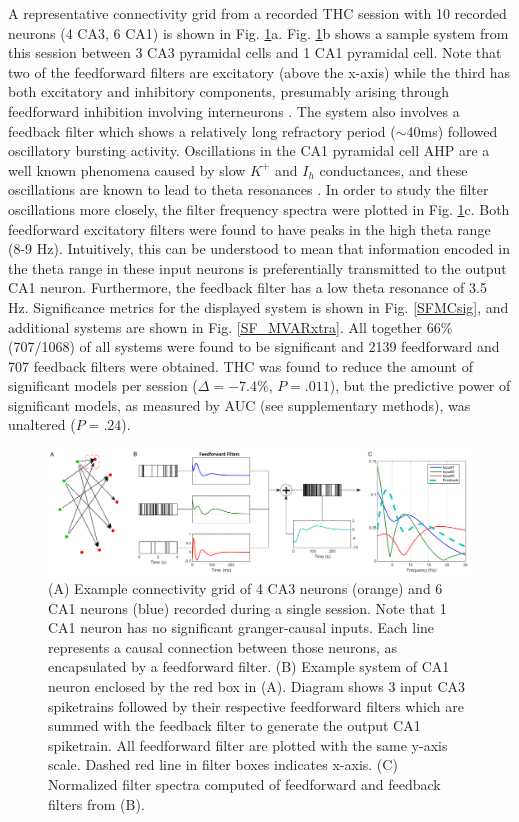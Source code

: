 \documentclass[11pt,a4paper,final]{article}
\begin{document}
A representative connectivity grid from a recorded THC session with 10 recorded neurons (4 CA3, 6 CA1) is shown in Fig. \ref{ex}a.
Fig. \ref{ex}b shows a sample system from this session between 3 CA3 pyramidal cells and 1 CA1 pyramidal cell.
Note that two of the feedforward filters are excitatory (above the x-axis) while the third has both excitatory and inhibitory components, presumably arising through feedforward inhibition involving interneurons \citep{pouille01,zemankovics13}.
The system also involves a feedback filter which shows a relatively long refractory period ($\sim$40ms) followed oscillatory bursting activity.
Oscillations in the CA1 pyramidal cell AHP are a well known phenomena caused by slow $K^+$ and $I_h$ conductances, and these oscillations are known to lead to theta resonances \citep{leung98,yarom00,sandler14}.
In order to study the filter oscillations more closely, the filter frequency spectra were plotted in Fig. \ref{ex}c.
Both feedforward excitatory filters were found to have peaks in the high theta range (8-9 Hz).
Intuitively, this can be understood to mean that information encoded in the theta range in these input neurons is preferentially transmitted to the output CA1 neuron.
Furthermore, the feedback filter has a low theta resonance of 3.5 Hz.
Significance metrics for the displayed system is shown in Fig. \ref{SFMCsig}, and additional systems are shown in Fig. \ref{SF_MVARxtra}.
All together 66\% (707/1068) of all systems were found to be significant and 2139 feedforward and 707 feedback filters were obtained.
THC was found to reduce the amount of significant models per session ($\Delta=-7.4\%$, $P=.011$), but the predictive power of significant models, as measured by AUC (see supplementary methods), was unaltered ($P=.24$).

\begin{figure}[!ht]
\centering
\includegraphics[width=160mm]{ex_tmp}
\caption[Example System]{
(A) Example connectivity grid of 4 CA3 neurons (orange) and 6 CA1 neurons (blue) recorded during a single session. Note that 1 CA1 neuron has no significant granger-causal inputs. Each line represents a causal connection between those neurons, as encapsulated by a feedforward filter.
(B) Example system of CA1 neuron enclosed by the red box in (A). Diagram shows 3 input CA3 spiketrains followed by their respective feedforward filters which are summed with the feedback filter to generate the output CA1 spiketrain. All feedforward filter are plotted with the same y-axis scale. Dashed red line in filter boxes indicates x-axis.
(C) Normalized filter spectra computed of feedforward and feedback filters from (B).}
\label{ex}
\end{figure}
\end{document}
